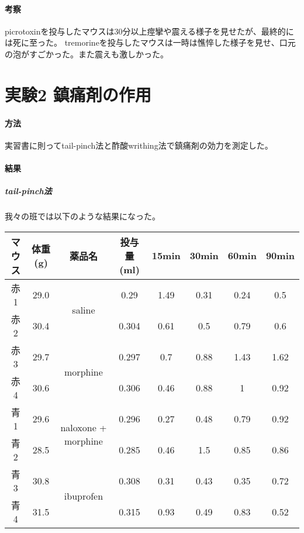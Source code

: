 \documentclass[a4paper,papersize,dvipdfmx]{jsarticle}
\begin{document}
\subsection*{考察}
picrotoxinを投与したマウスは30分以上痙攣や震える様子を見せたが、最終的には死に至った。
tremorineを投与したマウスは一時は憔悴した様子を見せ、口元の泡がすごかった。また震えも激しかった。




\part*{実験2 鎮痛剤の作用}


\subsection*{方法}
実習書に則ってtail-pinch法と酢酸writhing法で鎮痛剤の効力を測定した。

\subsection*{結果}

\subsubsection*{tail-pinch法}

我々の班では以下のような結果になった。

\begin{table}[H]
\centering
\begin{tabular}{|c|c|c|c|c|c|c|c|}
\hline
マウス & 体重(g) & 薬品名                                  & 投与量(ml) & 15min & 30min & 60min & 90min \\ \hline
赤1  & 29.0  & \multirow{2}{*}{saline}              & 0.29    & 1.49  & 0.31  & 0.24  & 0.5   \\ \cline{1-2} \cline{4-8}
赤2  & 30.4  &                                      & 0.304   & 0.61  & 0.5   & 0.79  & 0.6   \\ \hline
赤3  & 29.7  & \multirow{2}{*}{morphine}            & 0.297   & 0.7   & 0.88  & 1.43  & 1.62  \\ \cline{1-2} \cline{4-8}
赤4  & 30.6  &                                      & 0.306   & 0.46  & 0.88  & 1     & 0.92  \\ \hline
青1  & 29.6  & \multirow{2}{*}{naloxone + morphine} & 0.296   & 0.27  & 0.48  & 0.79  & 0.92  \\ \cline{1-2} \cline{4-8}
青2  & 28.5  &                                      & 0.285   & 0.46  & 1.5   & 0.85  & 0.86  \\ \hline
青3  & 30.8  & \multirow{2}{*}{ibuprofen}           & 0.308   & 0.31  & 0.43  & 0.35  & 0.72  \\ \cline{1-2} \cline{4-8}
青4  & 31.5  &                                      & 0.315   & 0.93  & 0.49  & 0.83  & 0.52  \\ \hline
\end{tabular}
\end{table}
\end{document}

